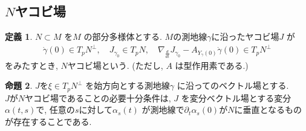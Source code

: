 \documentclass[twocolumn, landscape, a4paper , 8pt, fleqn, titlepage ]{jsarticle}
\theoremstyle{definition}
\newtheorem{dfn}{定義}[section]
\newtheorem{prop}[dfn]{命題}
\renewcommand{\-}{\hyphen}
\begin{document}
\subsection{$N$ヤコビ場}

\begin{dfn}
$N\subset M$ を$M$ の部分多様体とする. $M$の測地線$\gamma $に沿ったヤコビ場$J$ が
\begin{align*} \dot \gamma(0) \in T_p N ^\perp , \quad J_{\gamma_0} \in T_pN, \quad \nabla_{\frac{d}{dt}} J_{\gamma_0} - A_{Y_\gamma(0)} \dot \gamma(0) \in T_p N^\perp  \end{align*}
をみたすとき, $N$ヤコビ場という. (ただし, $A$ は型作用素である.)
\end{dfn}

\begin{prop}
$J$を$\xi \in T_p N ^\perp$ を始方向とする測地線$\gamma$ に沿ってのベクトル場とする. \\
$J$が$N$ヤコビ場であることの必要十分条件は, $J$ を変分ベクトル場とする変分$\alpha(t,s)$で, 任意の$s$に対して$\alpha_s (t)$ が測地線で$\partial_t \alpha_s (0)$が$N$に垂直となるものが存在することである. 
\end{prop}
\end{document}
